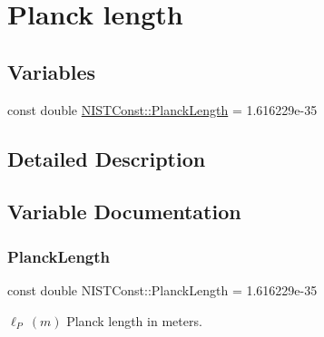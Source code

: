 \hypertarget{group___n_i_s_t_const-_planck_length}{}\section{Planck length}
\label{group___n_i_s_t_const-_planck_length}
\subsection*{Variables}
\begin{DoxyCompactItemize}
\item 
const double \mbox{\hyperlink{group___n_i_s_t_const-_planck_length_ga1bc5c33e67f9810e7505b30076df5ca3}{N\+I\+S\+T\+Const\+::\+Planck\+Length}} = 1.\+616229e-\/35
\end{DoxyCompactItemize}


\subsection{Detailed Description}


\subsection{Variable Documentation}
\mbox{\label{group___n_i_s_t_const-_planck_length_ga1bc5c33e67f9810e7505b30076df5ca3}} 
\subsubsection{\texorpdfstring{Planck\+Length}{PlanckLength}}
{\footnotesize\ttfamily const double N\+I\+S\+T\+Const\+::\+Planck\+Length = 1.\+616229e-\/35}

$\ell_P \ (m)$ Planck length in meters. 